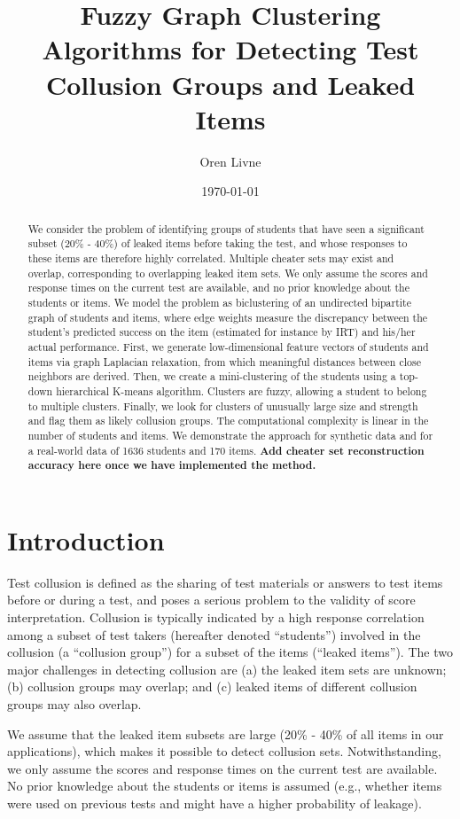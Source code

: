 \documentclass{article}
\title{Fuzzy Graph Clustering Algorithms for Detecting Test Collusion Groups and Leaked Items}
\author[1]{Oren Livne}
\affil[1]{Educational Testing Service, 660 Rosedale Road, Attn: MS-12, T-197, Princeton, NJ 08540. Email: olivne@ets.org}
\date{\today}
\begin{document}
\maketitle

\begin{abstract}
We consider the problem of identifying groups of students that have seen a significant subset (20\% - 40\%) of leaked items before taking the test, and whose responses to these items are therefore highly correlated. Multiple cheater sets may exist and overlap, corresponding to overlapping leaked item sets. We only assume the scores and response times on the current test are available, and no  prior knowledge about the students or items. We model the problem as biclustering of an undirected bipartite graph of students and items, where edge weights measure the discrepancy between the student's predicted success on the item (estimated for instance by IRT) and his/her actual performance. First, we generate low-dimensional feature vectors of students and items via graph Laplacian relaxation, from which meaningful distances between close neighbors are derived. Then, we create a mini-clustering of the students using a top-down hierarchical K-means algorithm. Clusters are fuzzy, allowing a student to belong to multiple clusters. Finally, we look for clusters of unusually large size and strength and flag them as likely collusion groups. The computational complexity is linear in the number of students and items. We demonstrate the approach for synthetic data and for a real-world data of 1636 students and 170 items. {\bf Add cheater set reconstruction accuracy here once we have implemented the method.}
\end{abstract}

\section{Introduction}
Test collusion is defined as the sharing of test materials or answers to test items before or during a test, and poses a serious problem to the validity of score interpretation. Collusion is typically indicated by a high response correlation among a subset of test takers (hereafter denoted ``students'') involved in the collusion (a ``collusion group'') for a subset of the items (``leaked items''). The two major challenges in detecting collusion are (a) the leaked item sets are unknown; (b) collusion groups may overlap; and (c) leaked items of different collusion groups may also overlap.

We assume that the leaked item subsets are large (20\% - 40\% of all items in our applications), which makes it possible to detect collusion sets. Notwithstanding, we only assume the scores and response times on the current test are available. No prior knowledge about the students or items is assumed (e.g., whether items were used on previous tests and might have a higher probability of leakage).
\end{document}
